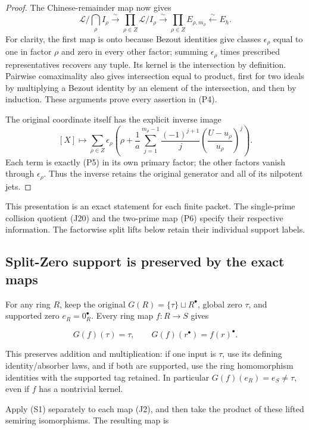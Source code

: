 \begin{proof}
The Chinese-remainder map now gives
\[
 \mathscr L\Big/\bigcap_\rho I_\rho
    \xrightarrow{\ \sim\ }\prod_{\rho\in Z}\mathscr L/I_\rho
    \xrightarrow{\ \sim\ }\prod_{\rho\in Z}E_{\rho,m_\rho}
    \xleftarrow{\ \sim\ }E_h.
 \tag{P6}
\]
For clarity, the first map is onto because Bezout identities give
classes \(\epsilon_\rho\) equal to one in factor \(\rho\) and
zero in every other factor; summing \(\epsilon_\rho\) times
prescribed representatives recovers any tuple. Its kernel is the
intersection by definition. Pairwise comaximality also gives
intersection equal to product, first for two ideals by multiplying
a Bezout identity by an element of the intersection, and then by
induction. These arguments prove every assertion in (P4).

The original coordinate itself has the explicit inverse image
\[
 [X]\longmapsto\sum_{\rho\in Z}\epsilon_\rho
 \left(\rho+\frac1a\sum_{j=1}^{m_\rho-1}
       \frac{(-1)^{j+1}}j
       \left(\frac{U-u_\rho}{u_\rho}\right)^j\right).
 \tag{P7}
\]
Each term is exactly (P5) in its own primary factor; the other
factors vanish through \(\epsilon_\rho\). Thus the inverse
retains the original generator and all of its nilpotent jets.
\end{proof}

This presentation is an exact statement for each finite packet.
The single-prime collision quotient (J20) and the two-prime map
(P6) specify their respective information. The factorwise split
lifts below retain their individual support labels.

\subsection{Split-Zero support is preserved by the exact maps}\label{split-zero-support-is-preserved-by-the-exact-maps}

For any ring \(R\), keep the original \(G(R)=\{\tau\}\sqcup R^\bullet\), global zero \(\tau\), and supported zero \(e_R=0_R^\bullet\). Every ring map \(f:R\longrightarrow S\) gives

\[
G(f)(\tau)=\tau,\qquad G(f)(r^\bullet)=f(r)^\bullet.
\tag{S1}
\]

This preserves addition and multiplication: if one input is \(\tau\), use its defining identity/absorber laws, and if both are supported, use the ring homomorphism identities with the supported tag retained. In particular \(G(f)(e_R)=e_S\ne \tau\), even if \(f\) has a nontrivial kernel.

Apply (S1) separately to each map (J2), and then take the product of
these lifted semiring isomorphisms. The resulting map is

